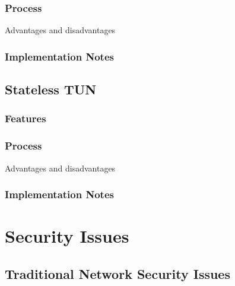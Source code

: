 \documentclass[iwp,first]{luthesis}
\begin{document}
\subsubsection {Process}
 
Advantages and disadvantages
\subsubsection {Implementation Notes}





















\subsection{Stateless TUN}

\subsubsection {Features}

\subsubsection {Process}

Advantages and disadvantages
\subsubsection {Implementation Notes}



















\section {Security Issues}  %

\subsection{Traditional Network Security Issues}
\end{document}
